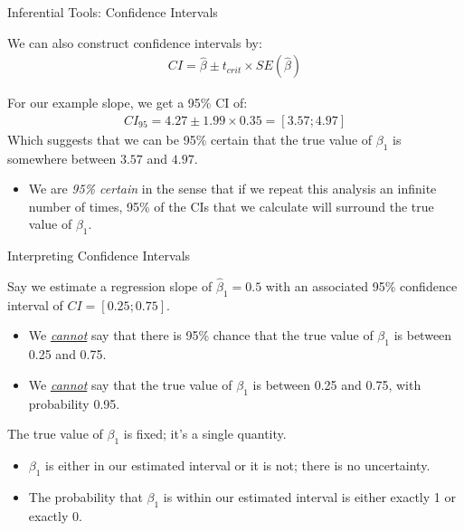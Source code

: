 \documentclass[10pt]{beamer}\usepackage[]{graphicx}\usepackage[]{color}
\begin{document}
\watermarkon %

\begin{frame}{Inferential Tools: Confidence Intervals}

  We can also construct confidence intervals by:
  \begin{align*}
    CI = \hat{\beta} \pm t_{crit} \times SE\left(\hat{\beta}\right)
  \end{align*}
  
  For our example slope, we get a 95\% CI of:
  \begin{align*}
    CI_{95} = 4.27 \pm 1.99 \times
    0.35 = [3.57; 4.97]
  \end{align*}
  Which suggests that we can be 95\% certain that the true value of $\beta_1$ is
  somewhere between $3.57$ and $4.97$.
  \vc
  \begin{itemize}
  \item We are \emph{95\% certain} in the sense that if we repeat this analysis 
    an infinite number of times, 95\% of the CIs that we calculate will surround
    the true value of $\beta_1$.
  \end{itemize}
  
\end{frame}


\begin{frame}{Interpreting Confidence Intervals}
  
  Say we estimate a regression slope of $\hat{\beta}_1 = 0.5$ with an associated
  95\% confidence interval of $CI = [0.25; 0.75]$.
  \pause
  \vc
  \begin{itemize}
  \item We \emph{\underline{cannot}} say that there is 95\% chance that the true 
    value of $\beta_1$ is between 0.25 and 0.75.
    \vc
  \item We \emph{\underline{cannot}} say that the true value of $\beta_1$ is 
    between 0.25 and 0.75, with probability 0.95.
  \end{itemize}
  \vb  
  \pause
  The true value of $\beta_1$ is fixed; it's a single quantity.
  \begin{itemize}
  \item $\beta_1$ is either in our estimated interval or it is not; there is no 
    uncertainty.
    \vc
  \item The probability that $\beta_1$ is within our estimated interval is either 
    exactly 1 or exactly 0.
  \end{itemize}
  
\end{frame}
\end{document}
